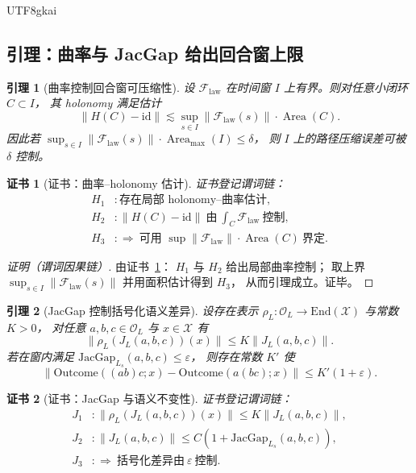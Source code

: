 \documentclass[12pt]{article}
\newtheorem{lemma}{引理}[section]
\newtheorem{Certificate}{证书}[section]
\newcommand{\GZLCurv}{\ensuremath{\mathcal{F}_{\mathrm{law}}}}
\newcommand{\JacGap}{\ensuremath{\mathrm{JacGap}}} %
\begin{document}
\begin{CJK*}{UTF8}{gkai}
\subsection{引理：曲率与 JacGap 给出回合窗上限}
\label{sec:round-window-lemmas}

\begin{lemma}[曲率控制回合窗可压缩性]
\label{lem:curvature-bounds-round-window}
设 $\GZLCurv$ 在时间窗 $I$ 上有界。则对任意小闭环 $C\subset I$，
其 holonomy 满足估计
\[
  \|H(C)-\mathrm{id}\|
  \lesssim
  \sup_{s\in I}\|\GZLCurv(s)\|\cdot \operatorname{Area}(C).
\]
因此若 $\sup_{s\in I}\|\GZLCurv(s)\|\cdot \operatorname{Area}_{\max}(I)\le \delta$，
则 $I$ 上的路径压缩误差可被 $\delta$ 控制。
\end{lemma}

\begin{Certificate}[证书：曲率--holonomy 估计]
\label{cert:curvature-bounds-round-window}
证书登记谓词链：
\[
\begin{aligned}
  H_1 &: \text{存在局部 holonomy--曲率估计},\\
  H_2 &: \|H(C)-\mathrm{id}\|\ \text{由}\ \int_C \GZLCurv\ \text{控制},\\
  H_3 &: \Rightarrow\ \text{可用 }\sup\|\GZLCurv\|\cdot \operatorname{Area}(C)\ \text{界定}.
\end{aligned}
\]
\end{Certificate}

\begin{proof}[证明（谓词因果链）]
由证书~\ref{cert:curvature-bounds-round-window}：
$H_1$ 与 $H_2$ 给出局部曲率控制；
取上界 $\sup_{s\in I}\|\GZLCurv(s)\|$ 并用面积估计得到 $H_3$，
从而引理成立。证毕。
\end{proof}

\begin{lemma}[JacGap 控制括号化语义差异]
\label{lem:jacgap-bounds-bracketing}
设存在表示 $\rho_L:\mathcal{O}_L\to \mathrm{End}(\mathcal{X})$ 与常数 $K>0$，
对任意 $a,b,c\in\mathcal{O}_L$ 与 $x\in\mathcal{X}$ 有
\[
  \|\rho_L(J_L(a,b,c))(x)\|\le K\|J_L(a,b,c)\|.
\]
若在窗内满足 $\JacGap_{L_s}(a,b,c)\le\varepsilon$，
则存在常数 $K'$ 使
\[
  \|\text{Outcome}((ab)c;x)-\text{Outcome}(a(bc);x)\|
  \le K'(1+\varepsilon).
\]
\end{lemma}

\begin{Certificate}[证书：JacGap 与语义不变性]
\label{cert:jacgap-bounds-bracketing}
证书登记谓词链：
\[
\begin{aligned}
  J_1 &: \|\rho_L(J_L(a,b,c))(x)\|\le K\|J_L(a,b,c)\|,\\
  J_2 &: \|J_L(a,b,c)\|\le C(1+\JacGap_{L_s}(a,b,c)),\\
  J_3 &: \Rightarrow\ \text{括号化差异由}\ \varepsilon\ \text{控制}.
\end{aligned}
\]
\end{Certificate}


\end{CJK*}
\end{document}
